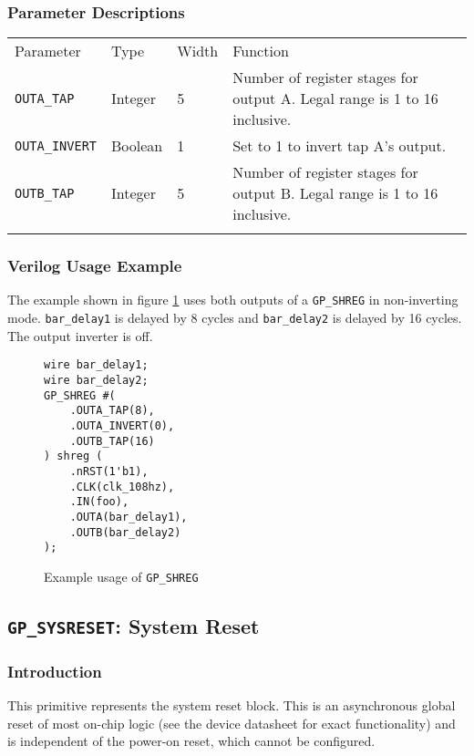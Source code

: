 \documentclass[11pt]{article}
\newcommand{\tokenstyle}[1]{\texttt{#1}}
\newcommand{\wirestyle}[1]{\texttt{#1}}
\newcommand{\whenstyle}[1]{{\fontseries{sb}\selectfont#1}}
\newcommand{\thinhline}{\Xhline{1\arrayrulewidth}}
\newcommand{\thickhline}{\Xhline{2.5\arrayrulewidth}}
\begin{document}
\subsubsection{Parameter Descriptions}

\begin{tabularx}{\textwidth}{lllX}
\thinhline
\whenstyle{Parameter} & \whenstyle{Type} & \whenstyle{Width} & \whenstyle{Function} \\
\thickhline
\tokenstyle{OUTA\_TAP} & Integer & 5 & Number of register stages for output A. Legal range is 1 to 16 inclusive.\\
\thinhline
\tokenstyle{OUTA\_INVERT} & Boolean & 1 & Set to 1 to invert tap A's output.\\
\thinhline
\tokenstyle{OUTB\_TAP} & Integer & 5 & Number of register stages for output B. Legal range is 1 to 16 inclusive.\\
\thinhline
\end{tabularx}

\subsubsection{Verilog Usage Example}

The example shown in figure \ref{gp-shreg-example} uses both outputs of a \tokenstyle{GP\_SHREG} in non-inverting mode.
\wirestyle{bar\_delay1} is delayed by 8 cycles and \wirestyle{bar\_delay2} is delayed by 16 cycles. The output inverter is off.

\begin{figure}[h]
\begin{lstlisting}
wire bar_delay1;
wire bar_delay2;
GP_SHREG #(
	.OUTA_TAP(8),
	.OUTA_INVERT(0),
	.OUTB_TAP(16)
) shreg (
	.nRST(1'b1),
	.CLK(clk_108hz),
	.IN(foo),
	.OUTA(bar_delay1),
	.OUTB(bar_delay2)
);
\end{lstlisting}
\caption{Example usage of \tokenstyle{GP\_SHREG}}
\label{gp-shreg-example}
\end{figure}


\pagebreak
\clearpage
\subsection{\tokenstyle{GP\_SYSRESET}: System Reset}
\label{gp-sysreset}

\subsubsection{Introduction}
This primitive represents the system reset block. This is an asynchronous global reset of most on-chip logic (see the
device datasheet for exact functionality) and is independent of the power-on reset, which cannot be configured.
\end{document}
